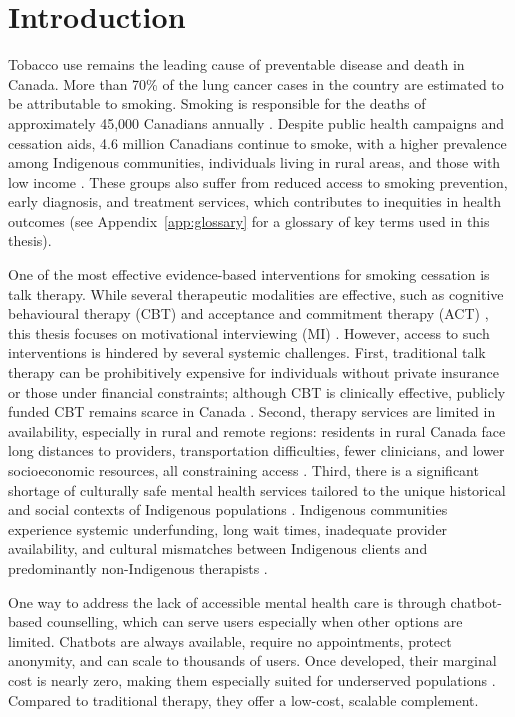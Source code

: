 \chapter{Introduction}

Tobacco use remains the leading cause of preventable disease and death in Canada. More than 70\% of the lung cancer cases in the country are estimated to be attributable to smoking. Smoking is responsible for the deaths of approximately 45,000 Canadians annually \cite{poirier2019estimates}. Despite public health campaigns and cessation aids, 4.6 million Canadians continue to smoke, with a higher prevalence among Indigenous communities, individuals living in rural areas, and those with low income \cite{cpac2020lung}. These groups also suffer from reduced access to smoking prevention, early diagnosis, and treatment services, which contributes to inequities in health outcomes (see Appendix~\ref{app:glossary} for a glossary of key terms used in this thesis).

One of the most effective evidence-based interventions for smoking cessation is talk therapy. While several therapeutic modalities are effective, such as cognitive behavioural therapy (CBT) \cite{beck2011cognitive} and acceptance and commitment therapy (ACT) \cite{hayes1999acceptance}, this thesis focuses on motivational interviewing (MI) \cite{MillerRollnick2023}. However, access to such interventions is hindered by several systemic challenges. First, traditional talk therapy can be prohibitively expensive for individuals without private insurance or those under financial constraints; although CBT is clinically effective, publicly funded CBT remains scarce in Canada \cite{doi:10.1177/0253717620957496,doi:10.1177/0706743716642416}. Second, therapy services are limited in availability, especially in rural and remote regions: residents in rural Canada face long distances to providers, transportation difficulties, fewer clinicians, and lower socioeconomic resources, all constraining access \cite{burns2007rural,james2021improving}. Third, there is a significant shortage of culturally safe mental health services tailored to the unique historical and social contexts of Indigenous populations \cite{josewski2023improving,hartwasekeesikaw2009cultural}. Indigenous communities experience systemic underfunding, long wait times, inadequate provider availability, and cultural mismatches between Indigenous clients and predominantly non-Indigenous therapists \cite{turner2018poverty}.


One way to address the lack of accessible mental health care is through chatbot-based counselling, which can serve users especially when other options are limited. Chatbots are always available, require no appointments, protect anonymity, and can scale to thousands of users. Once developed, their marginal cost is nearly zero, making them especially suited for underserved populations \cite{torous2017digital,miner2016smartphone}. Compared to traditional therapy, they offer a low-cost, scalable complement.



